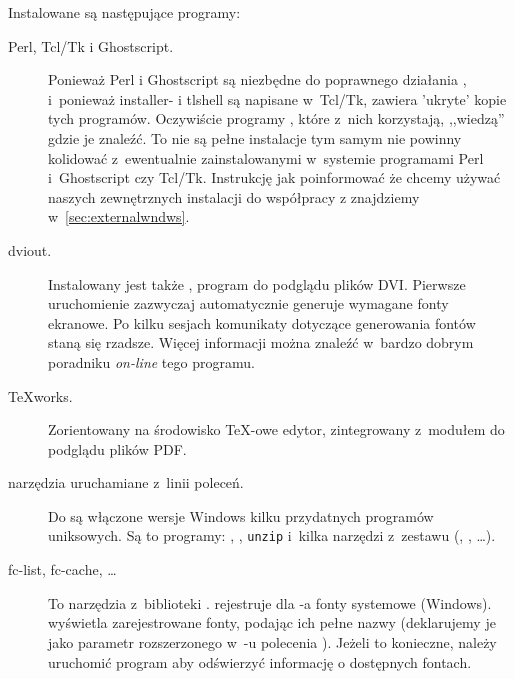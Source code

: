 \documentclass{article}
\begin{document}
Instalowane są następujące programy:
\begin{description}
\item[Perl, Tcl/Tk  i Ghostscript.] Ponieważ Perl i Ghostscript są niezbędne do
poprawnego działania \TL{}, i~ponieważ installer- i tlshell \GUI{} są napisane 
w~Tcl/Tk, \TL{} zawiera 'ukryte' kopie tych programów. Oczywiście  programy \TL{}, które z~nich korzystają, ,,wiedzą'' gdzie je znaleźć. To nie są pełne instalacje tym samym nie powinny
kolidować z~ewentualnie zainstalowanymi w~systemie programami Perl
i~Ghostscript czy Tcl/Tk. Instrukcję jak poinformować \TL{} że chcemy używać naszych zewnętrznych instalacji do współpracy z \TL{} znajdziemy w~\ref{sec:externalwndws}.
%

\item[dviout.] Instalowany jest także  , program do podglądu
plików DVI. Pierwsze uruchomienie  zazwyczaj automatycznie
generuje wymagane fonty ekranowe. Po kilku sesjach komunikaty dotyczące
generowania fontów staną się  rzadsze. Więcej informacji można znaleźć
w~bardzo dobrym poradniku \emph{on-line} tego programu.
\item[\TeX{}works.] Zorientowany na środowisko \TeX-owe edytor, zintegrowany
z~modułem do podglądu plików PDF.
\item[narzędzia uruchamiane z~linii poleceń.] Do \TL{} są włączone
 wersje Windows
 kilku przydatnych programów uniksowych. Są to programy: , , \texttt{unzip}  i~kilka narzędzi z~zestawu  (, , \ldots). %

\item[fc-list, fc-cache, \ldots] To narzędzia z~biblioteki .    
 rejestruje dla \XeTeX-a fonty systemowe (Windows).%
 wyświetla zarejestrowane
 fonty, podając ich pełne nazwy (deklarujemy je jako parametr rozszerzonego
 w~\XeTeX-u polecenia ). Jeżeli to konieczne, należy uruchomić program  aby odświerzyć   informację o dostępnych fontach.
\end{description}
\end{document}
